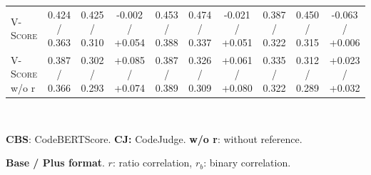 \begin{table}[t]
\begin{tabular}{@{}
        l|ccc|ccc|ccc@{}}
        \midrule
        \textsc{V-Score}        & 0.424 / 0.363   & 0.425 / 0.310   & -0.002 / +0.054                     & 0.453 / 0.388   & 0.474 / 0.337   & -0.021 / +0.051                     & 0.387 / 0.322   & 0.450 / 0.315   & -0.063 / +0.006                     \\
        \textsc{V-Score} w/o r  & 0.387 / 0.366   & 0.302 / 0.293   & +0.085 / +0.074                     & 0.387 / 0.389   & 0.326 / 0.309   & +0.061 / +0.080                     & 0.335 / 0.322   & 0.312 / 0.289   & +0.023 / +0.032                     \\
        \bottomrule
    \end{tabular}\\
    \begin{description}[itemsep=-3pt,topsep=0pt]
        \item \textbf{CBS}: CodeBERTScore. \hspace{10pt}  \textbf{CJ:} CodeJudge. \hspace{10pt} \textbf{w/o r}: without reference.
        \item \textbf{Base / Plus format}. $r$: ratio correlation, $r_b$: binary correlation.
    \end{description}
\end{table}